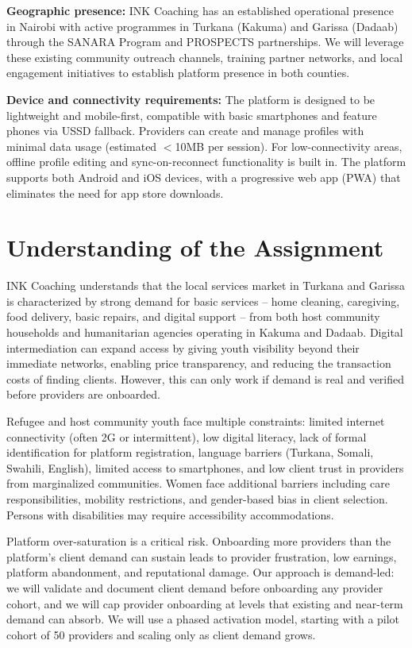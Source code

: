 \documentclass[11pt,a4paper]{article}
\begin{document}
\noindent \textbf{Geographic presence:} INK Coaching has an established operational presence in Nairobi with active programmes in Turkana (Kakuma) and Garissa (Dadaab) through the SANARA Program and PROSPECTS partnerships. We will leverage these existing community outreach channels, training partner networks, and local engagement initiatives to establish platform presence in both counties.

\noindent \textbf{Device and connectivity requirements:} The platform is designed to be lightweight and mobile-first, compatible with basic smartphones and feature phones via USSD fallback. Providers can create and manage profiles with minimal data usage (estimated $<$10MB per session). For low-connectivity areas, offline profile editing and sync-on-reconnect functionality is built in. The platform supports both Android and iOS devices, with a progressive web app (PWA) that eliminates the need for app store downloads.

\section{Understanding of the Assignment}
\noindent INK Coaching understands that the local services market in Turkana and Garissa is characterized by strong demand for basic services -- home cleaning, caregiving, food delivery, basic repairs, and digital support -- from both host community households and humanitarian agencies operating in Kakuma and Dadaab. Digital intermediation can expand access by giving youth visibility beyond their immediate networks, enabling price transparency, and reducing the transaction costs of finding clients. However, this can only work if demand is real and verified before providers are onboarded.

\noindent Refugee and host community youth face multiple constraints: limited internet connectivity (often 2G or intermittent), low digital literacy, lack of formal identification for platform registration, language barriers (Turkana, Somali, Swahili, English), limited access to smartphones, and low client trust in providers from marginalized communities. Women face additional barriers including care responsibilities, mobility restrictions, and gender-based bias in client selection. Persons with disabilities may require accessibility accommodations.

\noindent Platform over-saturation is a critical risk. Onboarding more providers than the platform's client demand can sustain leads to provider frustration, low earnings, platform abandonment, and reputational damage. Our approach is demand-led: we will validate and document client demand before onboarding any provider cohort, and we will cap provider onboarding at levels that existing and near-term demand can absorb. We will use a phased activation model, starting with a pilot cohort of 50 providers and scaling only as client demand grows.
\end{document}
